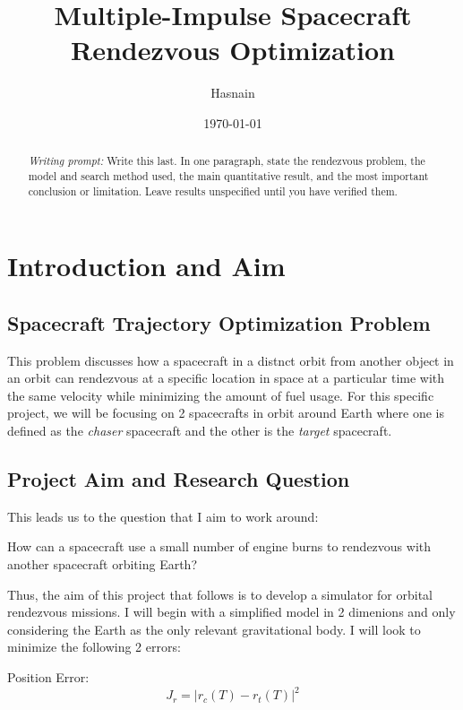 \documentclass[11pt,letterpaper]{article}
\title{Multiple-Impulse Spacecraft Rendezvous Optimization}
\author{Hasnain}
\date{\today}
\newcommand{\prompt}[1]{\par\noindent\textit{Writing prompt:} #1\par}
\newcommand{\abs}[1]{\left\lvert#1\right\rvert}
\begin{document}
\maketitle

\begin{abstract}
\prompt{Write this last. In one paragraph, state the rendezvous problem,
the model and search method used, the main quantitative result, and the
most important conclusion or limitation. Leave results unspecified until
you have verified them.}
\end{abstract}

\section{Introduction and Aim}
\subsection{Spacecraft Trajectory Optimization Problem}
This problem discusses how a spacecraft in a distnct orbit from another object in an orbit can rendezvous at a specific location in space at a particular time
with the same velocity while minimizing the amount of fuel usage. For this specific project, we will be focusing on 2 spacecrafts in orbit around Earth where one
is defined as the \textit{chaser} spacecraft and the other is the \textit{target} spacecraft. %

\subsection{Project Aim and Research Question} %
This leads us to the question that I aim to work around:
\begin{center}
How can a spacecraft use a small number of engine burns to rendezvous with another spacecraft orbiting Earth?
\end{center} %
Thus, the aim of this project that follows is to develop a simulator for orbital rendezvous missions. I will begin with a simplified model in 2 dimenions
and only considering the Earth as the only relevant gravitational body. I will look to minimize the following 2 errors:

Position Error:
\begin{equation}
J_r = \abs{r_c(T) - r_t(T)}^2
\label{eq:postion_error}
\end{equation}
\end{document}
